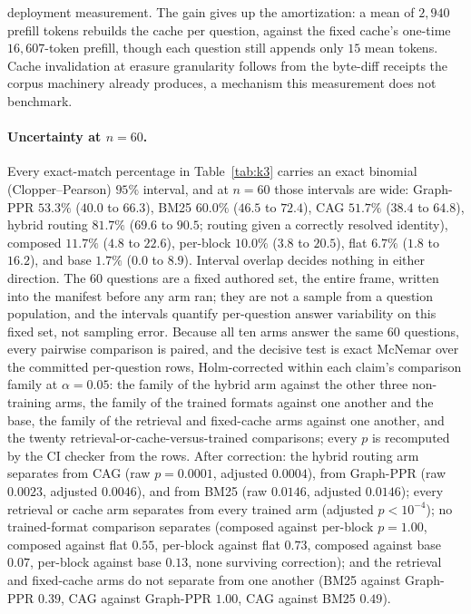 \documentclass{article}
\begin{document}
deployment measurement. The gain gives up the amortization: a mean of $2{,}940$ prefill tokens rebuilds the cache per question, against the fixed cache's one-time $16{,}607$-token prefill, though each question still appends only $15$ mean tokens. Cache invalidation at erasure granularity follows from the byte-diff receipts the corpus machinery already produces, a mechanism this measurement does not benchmark.

\paragraph{Uncertainty at $n{=}60$.}
Every exact-match percentage in Table~\ref{tab:k3} carries an exact binomial (Clopper--Pearson) $95\%$ interval, and at $n{=}60$ those intervals are wide: Graph-PPR $53.3\%$ ($40.0$ to $66.3$), BM25 $60.0\%$ ($46.5$ to $72.4$), CAG $51.7\%$ ($38.4$ to $64.8$), hybrid routing $81.7\%$ ($69.6$ to $90.5$; routing given a correctly resolved identity), composed $11.7\%$ ($4.8$ to $22.6$), per-block $10.0\%$ ($3.8$ to $20.5$), flat $6.7\%$ ($1.8$ to $16.2$), and base $1.7\%$ ($0.0$ to $8.9$). Interval overlap decides nothing in either direction. The 60 questions are a fixed authored set, the entire frame, written into the manifest before any arm ran; they are not a sample from a question population, and the intervals quantify per-question answer variability on this fixed set, not sampling error. Because all ten arms answer the same 60 questions, every pairwise comparison is paired, and the decisive test is exact McNemar over the committed per-question rows, Holm-corrected within each claim's comparison family at $\alpha{=}0.05$: the family of the hybrid arm against the other three non-training arms, the family of the trained formats against one another and the base, the family of the retrieval and fixed-cache arms against one another, and the twenty retrieval-or-cache-versus-trained comparisons; every $p$ is recomputed by the CI checker from the rows. After correction: the hybrid routing arm separates from CAG (raw $p{=}0.0001$, adjusted $0.0004$), from Graph-PPR (raw $0.0023$, adjusted $0.0046$), and from BM25 (raw $0.0146$, adjusted $0.0146$); every retrieval or cache arm separates from every trained arm (adjusted $p < 10^{-4}$); no trained-format comparison separates (composed against per-block $p{=}1.00$, composed against flat $0.55$, per-block against flat $0.73$, composed against base $0.07$, per-block against base $0.13$, none surviving correction); and the retrieval and fixed-cache arms do not separate from one another (BM25 against Graph-PPR $0.39$, CAG against Graph-PPR $1.00$, CAG against BM25 $0.49$).
\end{document}
